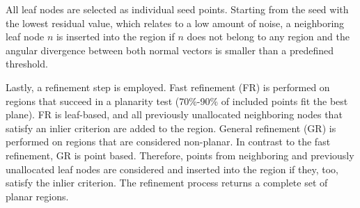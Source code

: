 \documentclass[main.tex]{subfiles}
\begin{document}
All leaf nodes are selected as individual seed points. Starting from the seed with the lowest residual value, which relates to a low amount of noise, 
a neighboring leaf node $n$ is inserted into the region if $n$ does not belong to any region and the angular divergence between both normal vectors is smaller than 
a predefined threshold. 

Lastly, a refinement step is employed. 
Fast refinement (FR) is performed on regions that succeed in a planarity test (70\%-90\% of included points fit the best plane). FR is leaf-based, and all previously unallocated neighboring nodes that satisfy an inlier criterion are added to the region.
General refinement (GR) is performed on regions that are considered non-planar. In contrast to the fast refinement, GR is point based. Therefore, 
points from neighboring and previously unallocated leaf nodes are considered and inserted into the region if they, too, satisfy the inlier criterion.
The refinement process returns a complete set of planar regions. 
\end{document}
